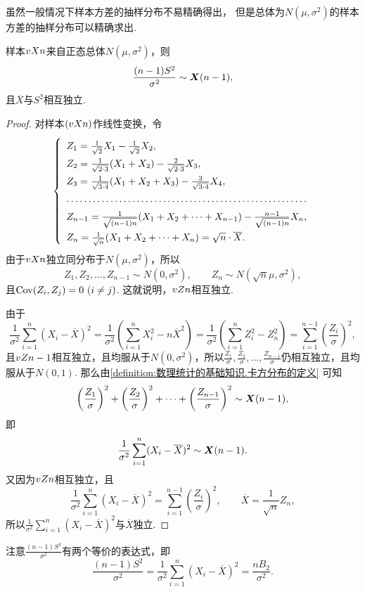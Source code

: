 虽然一般情况下样本方差的抽样分布不易精确得出，%
但是总体为\(N(\mu,\sigma^2)\)的样本方差的抽样分布可以精确求出.
\begin{theorem}\label{theorem:数理统计的基础知识.正态分布总体下样本方差的抽样分布}
样本\(v{X}{n}\)来自正态总体\(N(\mu,\sigma^2)\)，则\begin{equation}
\frac{(n-1)S^2}{\sigma^2} \sim \boldsymbol{X}(n-1),
\end{equation}
且\(\overline{X}\)与\(S^2\)相互独立.
\begin{proof}
对样本\((v{X}{n})\)作线性变换，令\[
\left\{ \def\arraystretch{1.5} \begin{array}{l}
Z_1 = \frac{1}{\sqrt{2}} X_1 - \frac{1}{\sqrt{2}} X_2, \\
Z_2 = \frac{1}{\sqrt{2\cdot3}} (X_1+X_2) - \frac{2}{\sqrt{2\cdot3}} X_3, \\
Z_3 = \frac{1}{\sqrt{3\cdot4}} (X_1+X_2+X_3) - \frac{3}{\sqrt{3\cdot4}} X_4, \\
\hdotsfor{1} \\
Z_{n-1} = \frac{1}{\sqrt{(n-1)n}} (X_1+X_2+\dotsb+X_{n-1}) - \frac{n-1}{\sqrt{(n-1)n}} X_n, \\
Z_n = \frac{1}{\sqrt{n}} (X_1+X_2+\dotsb+X_n) = \sqrt{n} \cdot \overline{X}.
\end{array} \right.
\]由于\(v{X}{n}\)独立同分布于\(N(\mu,\sigma^2)\)，所以\[
Z_1,Z_2,\dotsc,Z_{n-1} \sim N(0,\sigma^2), \qquad
Z_n \sim N(\sqrt{n} \mu,\sigma^2),
\]且\(\operatorname{Cov}(Z_i,Z_j) = 0\ (i \neq j)\).
这就说明，\(v{Z}{n}\)相互独立.

由于\[
\frac{1}{\sigma^2} \sum\limits_{i=1}^n (X_i-\overline{X})^2
= \frac{1}{\sigma^2} \left( \sum\limits_{i=1}^n X_i^2 - n \overline{X}^2 \right)
= \frac{1}{\sigma^2} \left( \sum\limits_{i=1}^n Z_i^2 - Z_n^2 \right)
= \sum\limits_{i=1}^{n-1} \left( \frac{Z_i}{\sigma} \right)^2,
\]且\(v{Z}{n-1}\)相互独立，且均服从于\(N(0,\sigma^2)\)，所以\(\frac{Z_1}{\sigma},\frac{Z_2}{\sigma},\dotsc,\frac{Z_{n-1}}{\sigma}\)仍相互独立，且均服从于\(N(0,1)\).
那么由\cref{definition:数理统计的基础知识.卡方分布的定义} 可知\[
\left( \frac{Z_1}{\sigma} \right)^2
+ \left( \frac{Z_2}{\sigma} \right)^2
+ \dotsb
+ \left( \frac{Z_{n-1}}{\sigma} \right)^2
\sim \boldsymbol{X}(n-1),
\]即\[
\frac{1}{\sigma^2} \sum\limits_{i=1}^n (X_i-\overline{X})^2 \sim \boldsymbol{X}(n-1).
\]又因为\(v{Z}{n}\)相互独立，且\[
\frac{1}{\sigma^2} \sum\limits_{i=1}^n (X_i-\overline{X})^2
= \sum\limits_{i=1}^{n-1} \left( \frac{Z_i}{\sigma} \right)^2,
\qquad
\overline{X} = \frac{1}{\sqrt{n}} Z_n,
\]所以\(\frac{1}{\sigma^2} \sum\limits_{i=1}^n (X_i-\overline{X})^2\)与\(\overline{X}\)独立.
\end{proof}
\end{theorem}
注意\(\frac{(n-1) S^2}{\sigma^2}\)有两个等价的表达式，即\[
\frac{(n-1) S^2}{\sigma^2}
= \frac{1}{\sigma^2} \sum\limits_{i=1}^n (X_i - \overline{X})^2
= \frac{n B_2}{\sigma^2}.
\]

